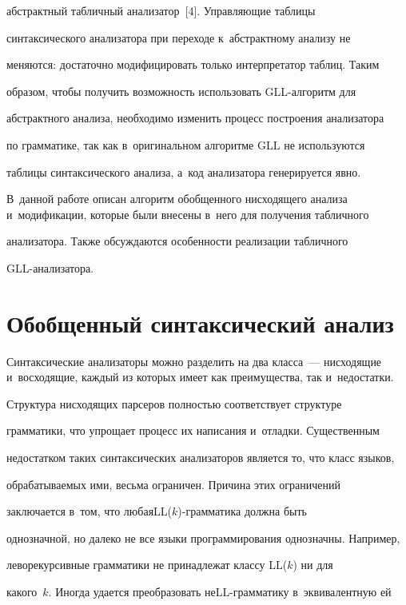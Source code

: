 абстрактный табличный анализатор~[4]. Управ\-ля\-ющие таб\-ли\-цы


синтаксического анализатора при переходе к~абстрактному анализу не


меняются: достаточно модифицировать только интерпретатор таблиц. Таким


образом, чтобы получить возможность использовать GLL-ал\-го\-ритм для


абстрактного анализа, необходимо изменить процесс построения анализатора


по грамматике, так как в~оригинальном алгоритме GLL не используются


таблицы синтаксического анализа, а~код анализатора генерируется явно.


В~данной работе описан алгоритм обобщенного нисходящего анализа и~модификации, которые были внесены в~него для получения табличного


анализатора. Также обсуждаются особенности реализации табличного


GLL-ана\-ли\-за\-тора.





\section{Обобщенный синтаксический анализ}





Синтаксические анализаторы можно разделить на два класса~--- нисходящие и~восходящие, каждый из которых имеет как преимущества, так и~недостатки.


Структура нисходящих парсеров полностью соответствует структуре


грамматики, что упрощает процесс их написания и~отладки. Существенным


недостатком таких синтаксических анализаторов является то, что класс языков,


обрабатываемых ими, весьма ограничен. Причина этих ограничений


заключается в~том, что любая\linebreak LL($k$)-грам\-ма\-ти\-ка должна быть


однозначной, но далеко не все языки программирования однозначны. Например,


леворекурсивные грамматики не принадлежат классу LL($k$) ни для


какого~$k$. Иногда удается преобразовать неLL-грам\-ма\-ти\-ку в~эквивалентную ей


